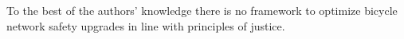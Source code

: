\documentclass[letterpaper, 10 pt, conference]{ieeeconf}  %
\begin{document}
To the best of the authors' knowledge there is no framework to optimize bicycle network safety upgrades in line with principles of justice.



\end{document}

